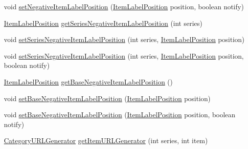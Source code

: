 \begin{DoxyCompactItemize}
\item 
void \mbox{\hyperlink{interfaceorg_1_1jfree_1_1chart_1_1renderer_1_1category_1_1_category_item_renderer_ab9b5e5946972d182e0052ea2fffe35a8}{set\+Negative\+Item\+Label\+Position}} (\mbox{\hyperlink{classorg_1_1jfree_1_1chart_1_1labels_1_1_item_label_position}{Item\+Label\+Position}} position, boolean notify)
\item 
\mbox{\hyperlink{classorg_1_1jfree_1_1chart_1_1labels_1_1_item_label_position}{Item\+Label\+Position}} \mbox{\hyperlink{interfaceorg_1_1jfree_1_1chart_1_1renderer_1_1category_1_1_category_item_renderer_a4d25d81d8fd4ce5d4b18f49663039e49}{get\+Series\+Negative\+Item\+Label\+Position}} (int series)
\item 
void \mbox{\hyperlink{interfaceorg_1_1jfree_1_1chart_1_1renderer_1_1category_1_1_category_item_renderer_ae3201c328eb9526f806b12183f187742}{set\+Series\+Negative\+Item\+Label\+Position}} (int series, \mbox{\hyperlink{classorg_1_1jfree_1_1chart_1_1labels_1_1_item_label_position}{Item\+Label\+Position}} position)
\item 
void \mbox{\hyperlink{interfaceorg_1_1jfree_1_1chart_1_1renderer_1_1category_1_1_category_item_renderer_a7f6bb08d17061232916f217b732f9ef6}{set\+Series\+Negative\+Item\+Label\+Position}} (int series, \mbox{\hyperlink{classorg_1_1jfree_1_1chart_1_1labels_1_1_item_label_position}{Item\+Label\+Position}} position, boolean notify)
\item 
\mbox{\hyperlink{classorg_1_1jfree_1_1chart_1_1labels_1_1_item_label_position}{Item\+Label\+Position}} \mbox{\hyperlink{interfaceorg_1_1jfree_1_1chart_1_1renderer_1_1category_1_1_category_item_renderer_a07449f382743d7ef7196b59f592c2b80}{get\+Base\+Negative\+Item\+Label\+Position}} ()
\item 
void \mbox{\hyperlink{interfaceorg_1_1jfree_1_1chart_1_1renderer_1_1category_1_1_category_item_renderer_afb74d6ac68ab31c59eb4654edebe2bf6}{set\+Base\+Negative\+Item\+Label\+Position}} (\mbox{\hyperlink{classorg_1_1jfree_1_1chart_1_1labels_1_1_item_label_position}{Item\+Label\+Position}} position)
\item 
void \mbox{\hyperlink{interfaceorg_1_1jfree_1_1chart_1_1renderer_1_1category_1_1_category_item_renderer_a35361f8772380ddbb5463c2caeb8ee29}{set\+Base\+Negative\+Item\+Label\+Position}} (\mbox{\hyperlink{classorg_1_1jfree_1_1chart_1_1labels_1_1_item_label_position}{Item\+Label\+Position}} position, boolean notify)
\item 
\mbox{\hyperlink{interfaceorg_1_1jfree_1_1chart_1_1urls_1_1_category_u_r_l_generator}{Category\+U\+R\+L\+Generator}} \mbox{\hyperlink{interfaceorg_1_1jfree_1_1chart_1_1renderer_1_1category_1_1_category_item_renderer_aeceb294cd4902cc86e674688c3e28897}{get\+Item\+U\+R\+L\+Generator}} (int series, int item)

\end{DoxyCompactItemize}
